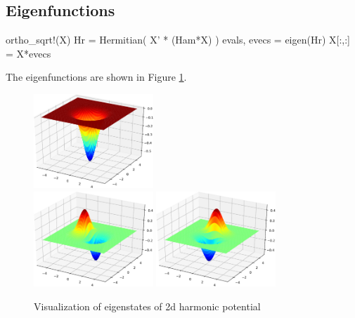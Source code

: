 \subsection{Eigenfunctions}

\begin{juliacode}
ortho_sqrt!(X)
Hr = Hermitian( X' * (Ham*X) )
evals, evecs = eigen(Hr)
X[:,:] = X*evecs
\end{juliacode}

The eigenfunctions are shown in Figure \ref{fig:harm_2d_eigenfunctions}.

\begin{figure}[H]
{\centering
\includegraphics[width=0.4\textwidth]{../codes/sch_2d/IMG_harmonic_psi_1.pdf}\\
\includegraphics[width=0.4\textwidth]{../codes/sch_2d/IMG_harmonic_psi_2.pdf}%
\includegraphics[width=0.4\textwidth]{../codes/sch_2d/IMG_harmonic_psi_3.pdf}
\par}
\caption{Visualization of eigenstates of 2d harmonic potential}
\label{fig:harm_2d_eigenfunctions}
\end{figure}

